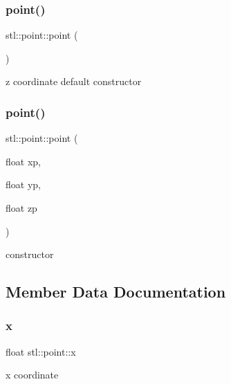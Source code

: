 \subsubsection{\texorpdfstring{point()}{point()}\hspace{0.1cm}{\footnotesize\ttfamily [1/2]}}
{\footnotesize\ttfamily stl\+::point\+::point (\begin{DoxyParamCaption}{ }\end{DoxyParamCaption})\hspace{0.3cm}{\ttfamily [inline]}}

z coordinate default constructor \mbox{\label{structstl_1_1point_a11d525a49dfad0dfb950d990ce258570}} 
\subsubsection{\texorpdfstring{point()}{point()}\hspace{0.1cm}{\footnotesize\ttfamily [2/2]}}
{\footnotesize\ttfamily stl\+::point\+::point (\begin{DoxyParamCaption}\item[{float}]{xp,  }\item[{float}]{yp,  }\item[{float}]{zp }\end{DoxyParamCaption})\hspace{0.3cm}{\ttfamily [inline]}}

constructor 

\subsection{Member Data Documentation}
\mbox{\label{structstl_1_1point_a346ae3ec6b455412446d88d9a6d2f46f}} 
\subsubsection{\texorpdfstring{x}{x}}
{\footnotesize\ttfamily float stl\+::point\+::x}

x coordinate \mbox{\label{structstl_1_1point_af010147291568343ad5736eccd2318d4}} 
